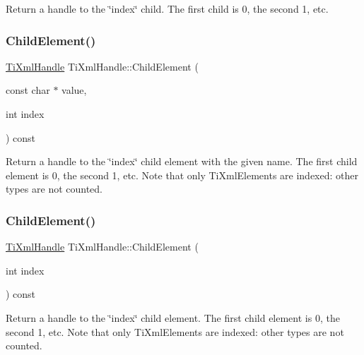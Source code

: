 Return a handle to the \char`\"{}index\char`\"{} child. The first child is 0, the second 1, etc. \hypertarget{class_ti_xml_handle_afccc59d8a0daa8c5d78474fbed430ddb}{}\label{class_ti_xml_handle_afccc59d8a0daa8c5d78474fbed430ddb} 
\subsubsection{\texorpdfstring{Child\+Element()}{ChildElement()}\hspace{0.1cm}{\footnotesize\ttfamily [1/2]}}
{\footnotesize\ttfamily \hyperlink{class_ti_xml_handle}{Ti\+Xml\+Handle} Ti\+Xml\+Handle\+::\+Child\+Element (\begin{DoxyParamCaption}\item[{const char $\ast$}]{value,  }\item[{int}]{index }\end{DoxyParamCaption}) const}

Return a handle to the \char`\"{}index\char`\"{} child element with the given name. The first child element is 0, the second 1, etc. Note that only Ti\+Xml\+Elements are indexed\+: other types are not counted. \hypertarget{class_ti_xml_handle_a57a639ab0ac99ff9358f675a1b73049a}{}\label{class_ti_xml_handle_a57a639ab0ac99ff9358f675a1b73049a} 
\subsubsection{\texorpdfstring{Child\+Element()}{ChildElement()}\hspace{0.1cm}{\footnotesize\ttfamily [2/2]}}
{\footnotesize\ttfamily \hyperlink{class_ti_xml_handle}{Ti\+Xml\+Handle} Ti\+Xml\+Handle\+::\+Child\+Element (\begin{DoxyParamCaption}\item[{int}]{index }\end{DoxyParamCaption}) const}

Return a handle to the \char`\"{}index\char`\"{} child element. The first child element is 0, the second 1, etc. Note that only Ti\+Xml\+Elements are indexed\+: other types are not counted. \hypertarget{class_ti_xml_handle_ae9b22d71bf5f69ee5fda28f5ad21f19c}{}\label{class_ti_xml_handle_ae9b22d71bf5f69ee5fda28f5ad21f19c} 
